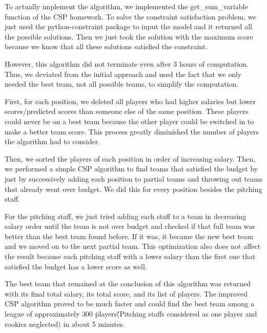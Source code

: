 \documentclass[12pt]{amsart}
\begin{document}
To actually implement the algorithm, we implemented the get\_sum\_variable function of the CSP homework. To solve the constraint satisfaction problem, we just used the python-constraint package to input the model and it returned all the possible solutions. Then we just took the solution with the maximum score because we know that all these solutions satisfied the constraint.
\vspace{.4cm}

However, this algorithm did not terminate even after 3 hours of computation. Thus, we deviated from the initial approach and used the fact that we only needed the best team, not all possible teams, to simplify the computation. 
\vspace{.4cm}

First, for each position, we deleted all players who had higher salaries but lower scores/predicted scores than someone else of the same position. These players could never be on a best team because the other player could be switched in to make a better team score. This process greatly diminished the number of players the algorithm had to consider.
\vspace{.4cm}

Then, we sorted the players of each position in order of increasing salary. Then, we performed a simple CSP algorithm to find teams that satisfied the budget by just by successively adding each position to partial teams and throwing out teams that already went over budget. We did this for every position besides the pitching staff. 
\vspace{.4cm}

For the pitching staff, we just tried adding each staff to a team in decreasing salary order until the team is not over budget and checked if that full team was better than the best team found before. If it was, it became the new best team and we moved on to the next partial team. This optimization also does not affect the result because each pitching staff with a lower salary than the first one that satisfied the budget has a lower score as well. 
\vspace{.4cm}

The best team that remained at the conclusion of this algorithm was returned with its final total salary, its total score, and its list of players. The improved CSP algorithm proved to be much faster and could find the best team among a league of approximately 300 \"players\" (Pitching staffs considered as one player and rookies neglected) in about 5 minutes.
\end{document}

